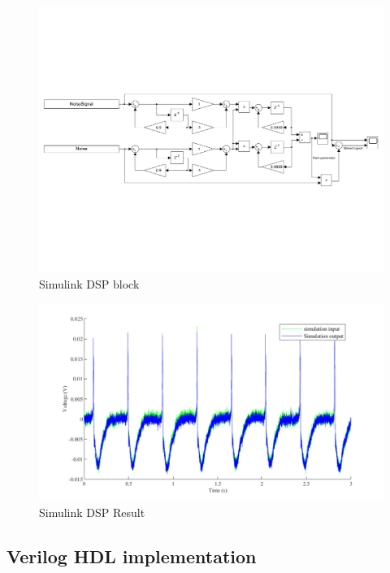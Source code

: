 \begin{figure}[h]
\centering
\includegraphics[width=1\linewidth]{4-ANC_Sys/Simulink.pdf}
\caption{Simulink DSP block}
\label{fig_Simulink}
\end{figure}

\begin{figure}[h]
\centering
\includegraphics[width=1\linewidth]{4-ANC_Sys/SimulinkResult.pdf}
\caption{Simulink DSP Result}
\label{fig_SimulinkResult}
\end{figure}

\subsection{Verilog HDL implementation}


